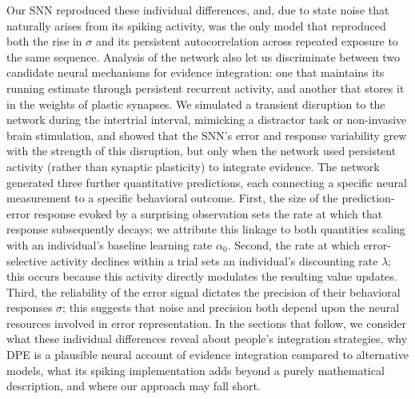 \documentclass[12pt]{article}
\begin{document}
Our SNN reproduced these individual differences, and, due to state noise that naturally arises from its spiking activity, was the only model that reproduced both the rise in $\sigma$ and its persistent autocorrelation across repeated exposure to the same sequence. Analysis of the network also let us discriminate between two candidate neural mechanisms for evidence integration: one that maintains its running estimate through persistent recurrent activity, and another that stores it in the weights of plastic synapses. We simulated a transient disruption to the network during the intertrial interval, mimicking a distractor task or non-invasive brain stimulation, and showed that the SNN's error and response variability grew with the strength of this disruption, but only when the network used persistent activity (rather than synaptic plasticity) to integrate evidence. The network generated three further quantitative predictions, each connecting a specific neural measurement to a specific behavioral outcome. First, the size of the prediction-error response evoked by a surprising observation sets the rate at which that response subsequently decays; we attribute this linkage to both quantities scaling with an individual's baseline learning rate $\alpha_0$. Second, the rate at which error-selective activity declines within a trial sets an individual's discounting rate $\lambda$; this occurs because this activity directly modulates the resulting value updates. Third, the reliability of the error signal dictates the precision of their behavioral responses $\sigma$; this suggests that noise and precision both depend upon the neural resources involved in error representation. In the sections that follow, we consider what these individual differences reveal about people's integration strategies, why DPE is a plausible neural account of evidence integration compared to alternative models, what its spiking implementation adds beyond a purely mathematical description, and where our approach may fall short.
\end{document}

